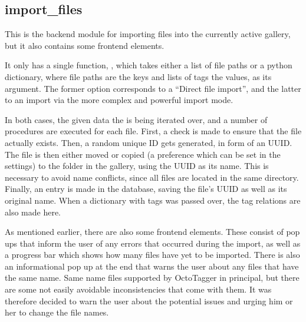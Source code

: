 \subsection{import\_files}

This is the backend module for importing files into the currently active gallery, but it also contains some frontend elements.

It only has a single function, , which takes either a list of file paths or a python dictionary, where file paths are the keys and lists of tags the values, as its argument. The former option corresponds to a ``Direct file import'', and the latter to an import via the more complex and powerful import mode.

In both cases, the given data the is being iterated over, and a number of procedures are executed for each file. First, a check is made to ensure that the file actually exists. Then, a random unique ID gets generated, in form of an UUID. The file is then either moved or copied (a preference which can be set in the settings) to the  folder in the gallery, using the UUID as its name. This is necessary to avoid name conflicts, since all files are located in the same directory. Finally, an entry is made in the database, saving the file's UUID as well as its original name. When a dictionary with tags was passed over, the tag relations are also made here.

As mentioned earlier, there are also some frontend elements. These consist of pop ups that inform the user of any errors that occurred during the import, as well as a progress bar which shows how many files have yet to be imported. There is also an informational pop up at the end that warns the user about any files that have the same name. Same name files supported by OctoTagger in principal, but there are some not easily avoidable inconsistencies that come with them. It was therefore decided to warn the user about the potential issues and urging him or her to change the file names.